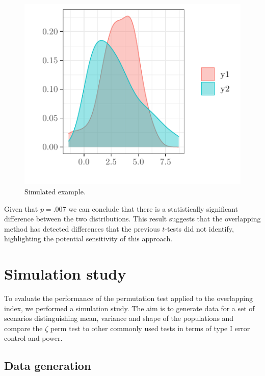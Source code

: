 \documentclass[twocolumn]{article}\usepackage[]{graphicx}\usepackage[]{xcolor}
\makeatletter
\def\maxwidth{ %
  \ifdim\Gin@nat@width>\linewidth
    \linewidth
  \else
    \Gin@nat@width
  \fi
}
\newenvironment{knitrout}{}{} %
\makeatother
\begin{document}
\begin{knitrout}
\color{fgcolor}\begin{figure}

{\centering \includegraphics[width=\maxwidth]{figure/example-1} 

}

\caption[Simulated example]{Simulated example.}\label{fig:example}
\end{figure}

\end{knitrout}

Given that $p = .007$ we can conclude that there is a statistically significant difference between the two distributions. This result suggests that the overlapping method has detected differences that the previous $t$-tests did not identify, highlighting the potential sensitivity of this approach.


\section{Simulation study}

To evaluate the performance of the permutation test applied to the overlapping index, we performed a simulation study. The aim is to generate data for a set of scenarios distinguishing mean, variance and shape of the populations and compare the $\zeta$ perm test to other commonly used tests in terms of type I error control and power. 

\subsection{Data generation}
\end{document}
